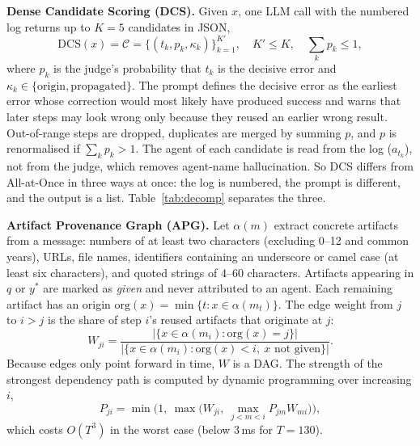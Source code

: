 \documentclass[conference]{IEEEtran}
\begin{document}
\textbf{Dense Candidate Scoring (DCS).} Given $x$, one LLM call with the numbered log returns up to $K=5$ candidates in JSON,
\begin{equation}
\mathrm{DCS}(x)=\mathcal{C}=\{(t_k,p_k,\kappa_k)\}_{k=1}^{K'},\quad K'\le K,\quad \textstyle\sum_k p_k\le 1,
\end{equation}
where $p_k$ is the judge's probability that $t_k$ is the decisive error and $\kappa_k\in\{\text{origin},\text{propagated}\}$. The prompt defines the decisive error as the earliest error whose correction would most likely have produced success and warns that later steps may look wrong only because they reused an earlier wrong result. Out-of-range steps are dropped, duplicates are merged by summing $p$, and $p$ is renormalised if $\sum_k p_k>1$. The agent of each candidate is read from the log ($a_{t_k}$), not from the judge, which removes agent-name hallucination. So DCS differs from All-at-Once in three ways at once: the log is numbered, the prompt is different, and the output is a list. Table~\ref{tab:decomp} separates the three.

\textbf{Artifact Provenance Graph (APG).} Let $\alpha(m)$ extract concrete artifacts from a message: numbers of at least two characters (excluding 0--12 and common years), URLs, file names, identifiers containing an underscore or camel case (at least six characters), and quoted strings of 4--60 characters. Artifacts appearing in $q$ or $y^*$ are marked as \emph{given} and never attributed to an agent. Each remaining artifact has an origin $\mathrm{org}(x)=\min\{t: x\in\alpha(m_t)\}$. The edge weight from $j$ to $i>j$ is the share of step $i$'s reused artifacts that originate at $j$:
\begin{equation}
W_{ji}=\frac{|\{x\in\alpha(m_i):\mathrm{org}(x)=j\}|}{|\{x\in\alpha(m_i):\mathrm{org}(x)<i,\ x \text{ not given}\}|}.
\end{equation}
Because edges only point forward in time, $W$ is a DAG. The strength of the strongest dependency path is computed by dynamic programming over increasing $i$,
\begin{equation}
P_{ji}=\min\Big(1,\ \max\big(W_{ji},\ \max_{j<m<i} P_{jm}W_{mi}\big)\Big),\label{eq:path}
\end{equation}
which costs $O(T^3)$ in the worst case (below 3\,ms for $T=130$).
\end{document}
